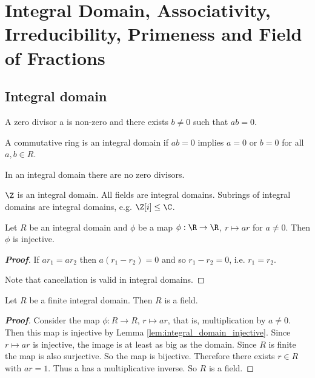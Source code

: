 \section{Integral Domain, Associativity, Irreducibility, Primeness and Field of Fractions}

\subsection{Integral domain}

\begin{definition}\label{def:zero_divisor_ring}
A zero divisor a is non-zero and there exists $b \neq 0$ such that $ab = 0$.
\end{definition}

\begin{definition}\label{def:integral_domain_ring}
A commutative ring is an integral domain if $ab = 0$ implies $a = 0$ or $b = 0$ for all $a, b \in R$.
\end{definition}

\begin{remark}
In an integral domain there are no zero divisors.
\end{remark}

\begin{example}
$\Z$ is an integral domain. All fields are integral domains. Subrings of integral domains are integral domains, e.g. $\Z[i] \leq \C$.
\end{example}


\begin{lemma}\label{lem:integral_domain_injective}
Let $R$ be an integral domain and $\phi$ be a map $\phi:\R\to \R$, $r \mapsto ar$ for $a\neq 0$. Then $\phi$ is injective.
\end{lemma}

\begin{proof}[\bf Proof]
If $ar_1 = ar_2$ then $a(r_1 - r_2) = 0$ and so $r_1 - r_2 = 0$, i.e. $r_1 = r_2$.

Note that cancellation is valid in integral domains.
\end{proof}

\begin{lemma}
Let $R$ be a finite integral domain. Then $R$ is a field.
\end{lemma}

\begin{proof}[\bf Proof]
Consider the map $\phi:R \to R$, $r \mapsto ar$, that is, multiplication by $a \neq 0$. Then this map is injective by Lemma \ref{lem:integral_domain_injective}. Since $r\mapsto ar$ is injective, the image is at least as big as the domain. Since $R$ is finite the map is also surjective. So the map is bijective. Therefore there exists $r \in R$ with $ar = 1$. Thus a has a multiplicative inverse. So $R$ is a field.
\end{proof}


